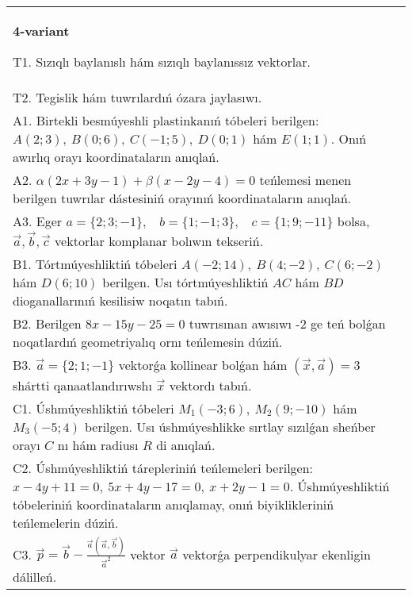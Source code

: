 \documentclass{article}
\begin{document}
\begin{tabular}{m{17cm}}
\textbf{4-variant}
\newline

T1. 
Sızıqlı baylanıslı hám sızıqlı baylanıssız vektorlar.
 \\
T2. 
Tegislik hám tuwrılardıń ózara jaylasıwı.
 \\
A1. 
Birtekli besmúyeshli plastinkanıń tóbeleri berilgen:
$A(2;3), \ B(0;6), \ C(-1;5), \ D(0;1)$ hám $E(1;1)$. Onıń awırlıq
orayı koordinataların anıqlań.
 \\
A2. 
$\alpha(2x+3y-1)+\beta(x-2y-4)=0$ teńlemesi
menen berilgen tuwrılar dástesiniń orayınıń koordinataların anıqlań.
 \\
A3. 
Eger \(a = \{ 2;3; - 1\},\ \ \ \ b = \{ 1; - 1;3\},\ \ \ \ c = \{ 1;9; - 11\}\) bolsa, $\overrightarrow{a}, \overrightarrow{b}, \overrightarrow{c}$ vektorlar komplanar bolıwın tekseriń.
 \\
B1. 
Tórtmúyeshliktiń tóbeleri
\(A(-2;14),\ B(4;-2),\ C(6;-2)\) hám \(D(6;10)\) berilgen. Usı
tórtmúyeshliktiń $AC$ hám $BD$ dioganallarınıń kesilisiw
noqatın tabıń.
 \\
B2. 
Berilgen \(8x-15y-25=0\) tuwrısınan awısıwı -2 ge
teń bolǵan noqatlardıń geometriyalıq ornı teńlemesin dúziń.
 \\
B3. 
$\vec{a} = \{ 2;1; - 1\}$ vektorǵa kollinear bolǵan hám $\left(\vec{x},\vec{a} \right) = 3$ shártti qanaatlandırıwshı $\vec{x}$ vektordı tabıń.
 \\
C1. 
Úshmúyeshliktiń tóbeleri \(M_{1}( - 3;6),\ M_{2}(9; - 10)\) 
hám \(M_{3}( - 5;4)\) berilgen. Usı úshmúyeshlikke sırtlay sızılǵan
sheńber orayı $C$ nı hám radiusı $R$ di anıqlań.
 \\
C2. 
Úshmúyeshliktiń tárepleriniń teńlemeleri berilgen:
\(x - 4y + 11 = 0,\ 5x + 4y - 17 = 0,\ x + 2y - 1 = 0.\) 
Úshmúyeshliktiń tóbeleriniń koordinataların anıqlamay, onıń
biyiklikleriniń teńlemelerin dúziń.
 \\
C3. 
\(\vec{p} = \vec{b} - \frac{\vec{a} (\vec{a},\vec{b}) }{{\vec{a}}^{2}}\) vektor \(\vec{a}\) vektorǵa perpendikulyar ekenligin dálilleń.
 \\

\end{tabular}
\vspace{1cm}
\end{document}
